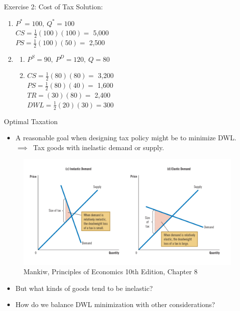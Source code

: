 \documentclass[9pt, handout]{beamer}
\begin{document}
\begin{frame}{Exercise 2: Cost of Tax}
Solution:
    \begin{enumerate}
        \item $P^* = 100, \: Q^* = 100$\\
        \vspace{5pt}
        $CS = \frac{1}{2}(100)(100) =$ 5,000\\
        \vspace{5pt}
        $PS = \frac{1}{2}(100)(50) =$ 2,500
        \item 
        \vspace{5pt}
        \begin{enumerate}[a]
            \item $P^S = 90, \: P^D = 120, \: Q = 80$
            \vspace{5pt}
            \item $CS = \frac{1}{2}(80)(80) =$ 3,200\\
            \vspace{5pt}
            $PS = \frac{1}{2}(80)(40) =$ 1,600\\
            \vspace{5pt}
            $TR = (30)(80) =$ 2,400\\
            \vspace{5pt}
            $DWL = \frac{1}{2}(20)(30) = 300$
        \end{enumerate}
    \end{enumerate}
\end{frame}

\begin{frame}{Optimal Taxation}
    \begin{itemize}
        \item A reasonable goal when designing tax policy might be to minimize DWL.\\
        $\implies \:$ Tax goods with inelastic demand or supply.
    \end{itemize}
    \begin{figure}
        \centering
        \includegraphics[width=0.8\linewidth]{elasticity_and_dwl.png}
        \caption{Mankiw, Principles of Economics 10th Edition, Chapter 8}
    \end{figure}
    \begin{itemize}
        \item But what kinds of goods tend to be inelastic?
        \item How do we balance DWL minimization with other considerations?
    \end{itemize}
\end{frame}
\end{document}
